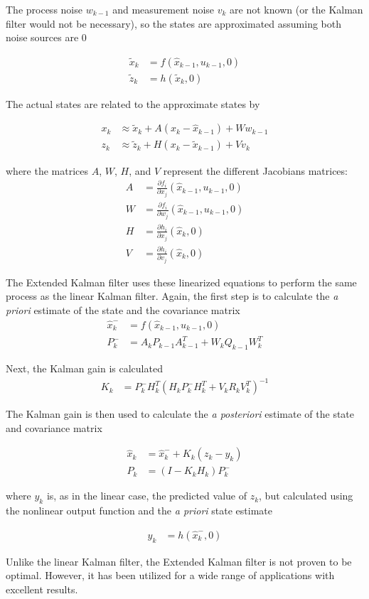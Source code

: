The process noise $w_{k-1}$ and measurement noise $v_k$ are not known (or the Kalman filter would not be necessary), so the states are approximated assuming both noise sources are 0

\begin{align}
\tilde{x}_k &= f(\hat{x}_{k-1},u_{k-1},0)\\
\tilde{z}_k &= h(\tilde{x}_k,0)
\end{align}

The actual states are related to the approximate states by

\begin{align}
x_k &\approx\tilde{x}_k+A(x_k-\hat{x}_{k-1})+Ww_{k-1}\\
z_k &\approx\tilde{z}_k+H(x_k-\tilde{x}_{k-1})+Vv_k
\end{align}

where  the matrices $A$, $W$, $H$, and $V$ represent the different Jacobians matrices:
\begin{align}
A &= \frac{\partial f_i}{\partial x_j}(\hat{x}_{k-1},u_{k-1},0)\\
W &= \frac{\partial f_i}{\partial w_j}(\hat{x}_{k-1},u_{k-1},0)\\
H &= \frac{\partial h_i}{\partial x_j}(\hat{x}_{k},0)\\
V &= \frac{\partial h_i}{\partial v_j}(\hat{x}_{k},0)
\end{align}

The Extended Kalman filter uses these linearized equations to perform the same process as the linear Kalman filter. Again, the first step is to calculate the \textit{a priori} estimate of the state and the covariance matrix
\begin{align}
\hat{x}^-_k &=f(\hat{x}_{k-1},u_{k-1},0)\\
P^-_k  &= A_kP_{k-1}A^T_{k-1}+W_kQ_{k-1}W^T_k
\end{align}

Next, the Kalman gain is calculated
\begin{align}
K_k &=P^-_kH^T_k(H_kP^-_kH^T_k+V_kR_kV^T_k)^{-1}
\end{align}

The Kalman gain is then used to calculate the \textit{a posteriori} estimate of the state and covariance matrix

\begin{align}
\hat{x}_k &=\hat{x}^-_{k}+K_k(z_k-y_k)\\
\label{kalmanVariance}
P_k &=(I-K_kH_k)P^-_k
\end{align}

where $y_k$ is, as in the linear case, the predicted value of $z_k$, but calculated using the nonlinear output function and the \textit{a priori} state estimate

\begin{align}
y_k &= h(\hat{x}^-_k,0)
\end{align}

Unlike the linear Kalman filter, the Extended Kalman filter is not proven to be optimal. However, it has been utilized for a wide range of applications with excellent results.
